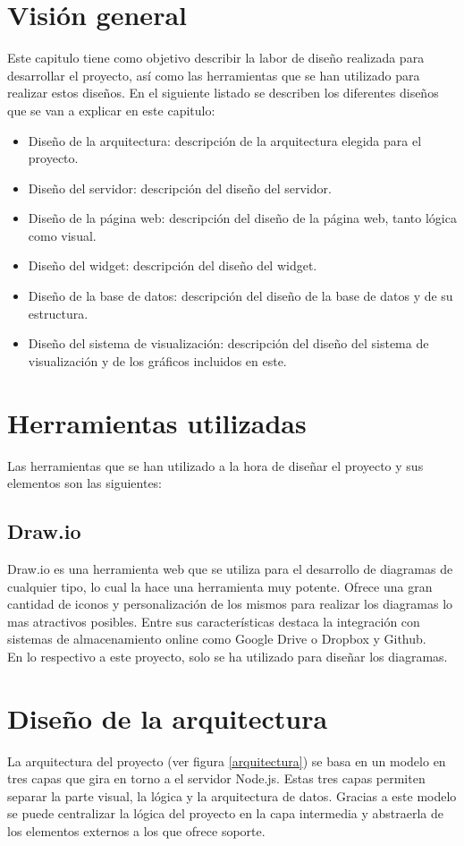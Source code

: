 \section{Visión general}
Este capitulo tiene como objetivo describir la labor de diseño realizada para desarrollar el proyecto, así como las herramientas que se han utilizado para realizar estos diseños. En el siguiente listado se describen los diferentes diseños que se van a explicar en este capitulo:

\begin{itemize}
	\item Diseño de la arquitectura: descripción de la arquitectura elegida para el proyecto.
	\item Diseño del servidor: descripción del diseño del servidor.
	\item Diseño de la página web: descripción del diseño de la página web, tanto lógica como visual.
	\item Diseño del widget: descripción del diseño del widget.
	\item Diseño de la base de datos: descripción del diseño de la base de datos y de su estructura.
	\item Diseño del sistema de visualización: descripción del diseño del sistema de visualización y de los gráficos incluidos en este.
\end{itemize}

\section{Herramientas utilizadas}
Las herramientas que se han utilizado a la hora de diseñar el proyecto y sus elementos son las siguientes:

\subsection{Draw.io}
Draw.io\cite{draw.io} es una herramienta web que se utiliza para el desarrollo de diagramas de cualquier tipo, lo cual la hace una herramienta muy potente. Ofrece una gran cantidad de iconos y personalización de los mismos para realizar los diagramas lo mas atractivos posibles. Entre sus características destaca la integración con sistemas de almacenamiento online como Google Drive o Dropbox y Github.\\

En lo respectivo a este proyecto, solo se ha utilizado para diseñar los diagramas.

\section{Diseño de la arquitectura}
La arquitectura del proyecto (ver figura \ref{arquitectura}) se basa en un modelo en tres capas que gira en torno a el servidor Node.js. Estas tres capas permiten separar la parte visual, la lógica y la arquitectura de datos. Gracias a este modelo se puede centralizar la lógica del proyecto en la capa intermedia y abstraerla de los elementos externos a los que ofrece soporte.\\

